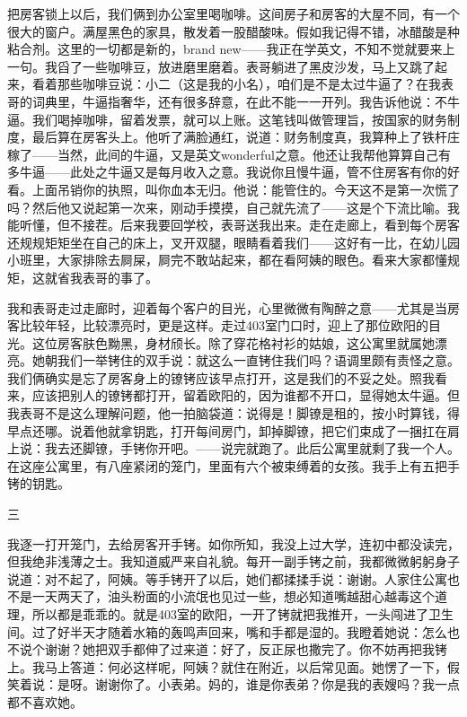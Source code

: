 把房客锁上以后，我们俩到办公室里喝咖啡。这间房子和房客的大屋不同，有一个很大的窗户。满屋黑色的家具，散发着一股醋酸味。假如我记得不错，冰醋酸是种粘合剂。这里的一切都是新的，brand new——我正在学英文，不知不觉就要来上一句。我舀了一些咖啡豆，放进磨里磨着。表哥躺进了黑皮沙发，马上又跳了起来，看着那些咖啡豆说：小二（这是我的小名），咱们是不是太过牛逼了？在我表哥的词典里，牛逼指奢华，还有很多辞意，在此不能一一开列。我告诉他说：不牛逼。我们喝掉咖啡，留着发票，就可以上账。这笔钱叫做管理旨，按国家的财务制度，最后算在房客头上。他听了满脸通红，说道：财务制度真，我算种上了铁杆庄稼了——当然，此间的牛逼，又是英文wonderful之意。他还让我帮他算算自己有多牛逼——此处之牛逼又是每月收入之意。我说你且慢牛逼，管不住房客有你的好看。上面吊销你的执照，叫你血本无归。他说：能管住的。今天这不是第一次慌了吗？然后他又说起第一次来，刚动手摸摸，自己就先流了——这是个下流比喻。我能听懂，但不接茬。后来我要回学校，表哥送我出来。走在走廊上，看到每个房客还规规矩矩坐在自己的床上，叉开双腿，眼睛看着我们——这好有一比，在幼儿园小班里，大家排除去屙屎，屙完不敢站起来，都在看阿姨的眼色。看来大家都懂规矩，这就省我表哥的事了。 

我和表哥走过走廊时，迎着每个客户的目光，心里微微有陶醉之意——尤其是当房客比较年轻，比较漂亮时，更是这样。走过403室门口时，迎上了那位欧阳的目光。这位房客肤色黝黑，身材颀长。除了穿花格衬衫的姑娘，这公寓里就属她漂亮。她朝我们一举铐住的双手说：就这么一直铐住我们吗？语调里颇有责怪之意。我们俩确实是忘了房客身上的镣铐应该早点打开，这是我们的不妥之处。照我看来，应该把别人的镣铐都打开，留着欧阳的，因为谁都不开口，显得她太牛逼。但我表哥不是这么理解问题，他一拍脑袋道：说得是！脚镣是租的，按小时算钱，得早点还哪。说着他就拿钥匙，打开每间房门，卸掉脚镣，把它们束成了一捆扛在肩上说：我去还脚镣，手铐你开吧。——说完就跑了。此后公寓里就剩了我一个人。在这座公寓里，有八座紧闭的笼门，里面有六个被束缚着的女孩。我手上有五把手铐的钥匙。 



三 

我逐一打开笼门，去给房客开手铐。如你所知，我没上过大学，连初中都没读完，但我绝非浅薄之士。我知道威严来自礼貌。每开一副手铐之前，我都微微躬躬身子说道：对不起了，阿姨。等手铐开了以后，她们都揉揉手说：谢谢。人家住公寓也不是一天两天了，油头粉面的小流氓也见过一些，想必知道嘴越甜心越毒这个道理，所以都是乖乖的。就是403室的欧阳，一开了铐就把我推开，一头闯进了卫生间。过了好半天才随着水箱的轰鸣声回来，嘴和手都是湿的。我瞪着她说：怎么也不说个谢谢？她把双手都伸了过来道：好了，反正尿也撒完了。你不妨再把我铐上。我马上答道：何必这样呢，阿姨？就住在附近，以后常见面。她愣了一下，假笑着说：是呀。谢谢你了。小表弟。妈的，谁是你表弟？你是我的表嫂吗？我一点都不喜欢她。 



